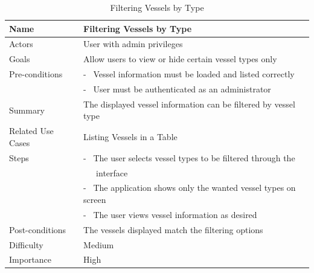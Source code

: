 \documentclass[12pt]{article}
\begin{document}
\begin{table}[ht]
\centering
   \begin{tabular}{|l|l|}
        \hline
        {\large Name} & {\large Filtering Vessels by Type} \\
        \hline\hline
        Actors & User with admin privileges\\
        \hline
        Goals & Allow users to view or hide certain vessel types only\\
        \hline
        Pre-conditions & - \ Vessel information must be loaded and listed correctly\\
         & - \ User must be authenticated as an administrator\\
        \hline
        Summary & The displayed vessel information can be filtered by vessel type\\
        \hline
        Related Use Cases & Listing Vessels in a Table\\
        \hline
        Steps & - \ The user selects vessel types to be filtered through the\\
         & \ \ \ interface\\
         & - \ The application shows only the wanted vessel types on screen\\
          & - \ The user views vessel information as desired\\
        \hline
        Post-conditions & The vessels displayed match the filtering options\\
        \hline
        Difficulty & Medium\\
        \hline
        Importance & High\\
        \hline
    \end{tabular}
\caption{Filtering Vessels by Type}
\end{table}
\end{document}
